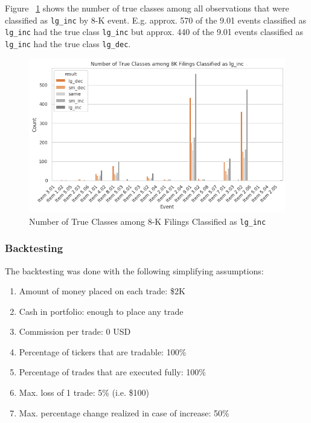 \documentclass{article}
\begin{document}
 	Figure ~\ref{fig:class_by_lg_dec} shows the number of true classes among all observations that were classified as \lstinline{lg_inc} by 8-K event. E.g. approx. 570 of the 9.01 events classified as \lstinline{lg_inc} had the true class \lstinline{lg_inc} but approx. 440 of the 9.01 events classified as \lstinline{lg_inc} had the true class \lstinline{lg_dec}.

	\begin{figure}[h!]
		\includegraphics[width=\linewidth]{img/class_by_lg_dec.png}
		\caption{Number of True Classes among 8-K Filings Classified as \lstinline{lg_inc}}
		\label{fig:class_by_lg_dec}
	\end{figure}

	\subsubsection{Backtesting}

	The backtesting was done with the following simplifying assumptions:
	
	\begin{enumerate}
		\item 	Amount of money placed on each trade: \$2K
		\item 	Cash in portfolio: enough to place any trade
		\item 	Commission per trade: 0 USD
		\item 	Percentage of tickers that are tradable: 100\%
		\item 	Percentage of trades that are executed fully: 100\%
		\item 	Max. loss of 1 trade: 5\% (i.e. \$100)
		\item 	Max. percentage change realized in case of increase: 50\%
	\end{enumerate}
\end{document}
